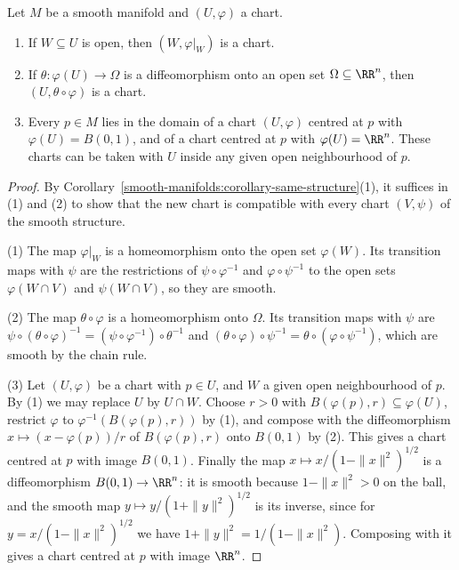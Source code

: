 \begin{lemma}\label{smooth-manifolds:lemma-chart-operations}
Let $M$ be a smooth manifold and $(U, \varphi)$ a chart.
\begin{enumerate}
\item If $W \subseteq U$ is open, then $(W, \varphi|_W)$ is a chart.
\item If $\theta \colon \varphi(U) \to \Omega$ is a diffeomorphism onto an open set $\Omega \subseteq \RR^n$, then $(U, \theta \circ \varphi)$ is a chart.
\item Every $p \in M$ lies in the domain of a chart $(U, \varphi)$ centred at $p$ with $\varphi(U) = B(0, 1)$, and of a chart centred at $p$ with
$\varphi(U) = \RR^n$. These charts can be taken with $U$ inside any given open neighbourhood of $p$.
\end{enumerate}
\end{lemma}

\begin{proof}
By Corollary~\ref{smooth-manifolds:corollary-same-structure}(1), it suffices in (1) and (2) to show that the new chart is compatible with every chart $(V, \psi)$
of the smooth structure.

(1) The map $\varphi|_W$ is a homeomorphism onto the open set $\varphi(W)$. Its transition maps with $\psi$ are the restrictions of $\psi \circ \varphi^{-1}$ and
$\varphi \circ \psi^{-1}$ to the open sets $\varphi(W \cap V)$ and $\psi(W \cap V)$, so they are smooth.

(2) The map $\theta \circ \varphi$ is a homeomorphism onto $\Omega$. Its transition maps with $\psi$ are $\psi \circ (\theta \circ \varphi)^{-1} =
(\psi \circ \varphi^{-1}) \circ \theta^{-1}$ and $(\theta \circ \varphi) \circ \psi^{-1} = \theta \circ (\varphi \circ \psi^{-1})$, which are smooth by the chain
rule.

(3) Let $(U, \varphi)$ be a chart with $p \in U$, and $W$ a given open neighbourhood of $p$. By (1) we may replace $U$ by $U \cap W$. Choose $r > 0$ with
$B(\varphi(p), r) \subseteq \varphi(U)$, restrict $\varphi$ to $\varphi^{-1}(B(\varphi(p), r))$ by (1), and compose with the diffeomorphism
$x \mapsto (x - \varphi(p))/r$ of $B(\varphi(p), r)$ onto $B(0, 1)$ by (2). This gives a chart centred at $p$ with image $B(0, 1)$. Finally the map
$x \mapsto x/(1 - \|x\|^2)^{1/2}$ is a diffeomorphism $B(0, 1) \to \RR^n$: it is smooth because $1 - \|x\|^2 > 0$ on the ball, and the smooth map
$y \mapsto y/(1 + \|y\|^2)^{1/2}$ is its inverse, since for $y = x/(1 - \|x\|^2)^{1/2}$ we have $1 + \|y\|^2 = 1/(1 - \|x\|^2)$. Composing with it gives a chart
centred at $p$ with image $\RR^n$.
\end{proof}

